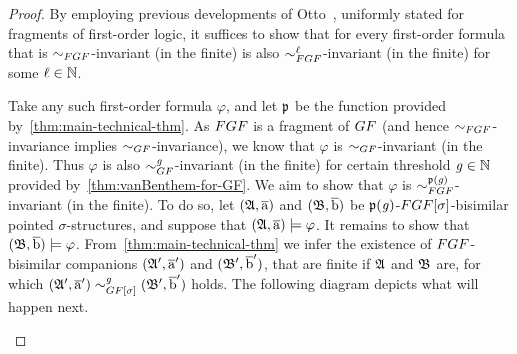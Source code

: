 \begin{proof}
By employing previous developments of Otto~\cite[Obs.~13]{Otto04}, uniformly stated for fragments of first-order logic, it suffices to show that for every first-order formula that is $\bisimto_{\FGF}$-invariant (in the finite) is also $\bisimto_{\FGF}^{\ell}$-invariant (in the finite) for some $\ell \in {\mathbb{N}}$.

Take any such first-order formula $\varphi$, and let $\mathfrak{p}$ be the function provided by~\cref{thm:main-technical-thm}.
As $\FGF$ is a fragment of $\GF$ (and hence $\bisimto_{\FGF}$-invariance implies $\bisimto_{\GF}$-invariance), we know that $\varphi$ is $\bisimto_{\GF}$-invariant (in the finite).
Thus $\varphi$ is also $\bisimto_{\GF}^{\mathit{g}}$-invariant (in the finite) for certain threshold $\mathit{g} \in {\mathbb{N}}$ provided by~\cref{thm:vanBenthem-for-GF}.
We aim to show that $\varphi$ is $\bisimto_{\FGF}^{\homop(\mathit{g})}$-invariant (in the finite).
To do so, let $({\mathfrak{A}}, \overline{\mathrm{a}})$ and $({\mathfrak{B}}, \overline{\mathrm{b}})$ be $\mathfrak{p}(\mathit{g})$-$\FGF[\sigma]$-bisimilar pointed $\sigma$-structures, and suppose that $({\mathfrak{A}}, \overline{\mathrm{a}}) \models \varphi$. It remains to show that $({\mathfrak{B}}, \overline{\mathrm{b}}) \models \varphi$.
From~\cref{thm:main-technical-thm} we infer the existence of $\FGF$-bisimilar companions $({\mathfrak{A}}', \overline{\mathrm{a}}')$ and $({\mathfrak{B}}', \overline{\mathrm{b}}')$, that are finite if ${\mathfrak{A}}$ and ${\mathfrak{B}}$ are, for which $(\str{A}', \elemtuplea') \bisimto^{\mathit{g}}_{\GF[\sigma]} (\str{B}', \elemtupleb')$ holds.
The following diagram depicts what will happen next.
\begin{figure}[H]
  \centering
\end{figure}
\end{proof}

